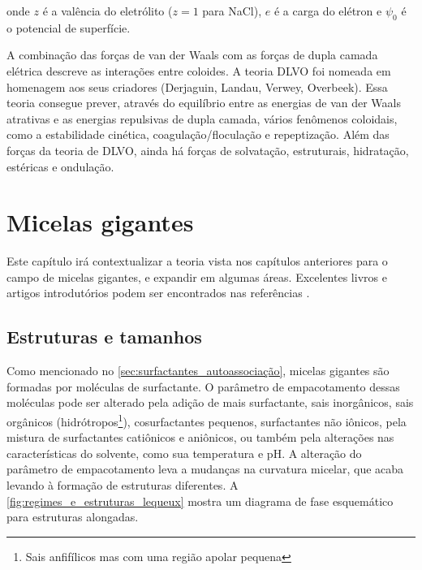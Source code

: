 	\noindent onde \(z\) é a valência do eletrólito (\(z=1\) para NaCl), \(e\) é a carga do elétron e \(\psi_0\) é o potencial de superfície.
	
	A combinação das forças de van der Waals com as forças de dupla camada elétrica descreve as interações entre coloides. A teoria DLVO foi nomeada em homenagem aos seus criadores (Derjaguin, Landau, Verwey, Overbeek). Essa teoria consegue prever, através do equilíbrio entre as energias de van der Waals atrativas e as energias repulsivas de dupla camada, vários fenômenos coloidais, como a estabilidade cinética, coagulação/floculação e repeptização. Além das forças da teoria de DLVO, ainda há forças de solvatação, estruturais, hidratação, estéricas e ondulação. 
	

	\chapter{Micelas gigantes} 
	Este capítulo irá contextualizar a teoria vista nos capítulos anteriores para o campo de micelas gigantes, e expandir em algumas áreas. Excelentes livros e artigos introdutórios podem ser encontrados nas referências \cite{Dreiss2007, Giant_Micelles, WLM_Advances, Herb1994, Ezrahi2006}.

		\label{chap:micelas_gigantes}
		\section{Estruturas e tamanhos}  %
		Como mencionado no \autoref{sec:surfactantes_autoassociação}, micelas gigantes são formadas por moléculas de surfactante. O parâmetro de empacotamento dessas moléculas pode ser alterado pela adição de mais surfactante, sais inorgânicos, sais orgânicos (hidrótropos\footnote{Sais anfifílicos mas com uma região apolar pequena}), cosurfactantes pequenos, surfactantes não iônicos, pela mistura de surfactantes catiônicos e aniônicos, ou também pela alterações nas características do solvente, como sua temperatura e pH.\cite{Dreiss2007} A alteração do parâmetro de empacotamento leva a mudanças na curvatura micelar, que acaba levando à formação de estruturas diferentes. A \autoref{fig:regimes_e_estruturas_lequeux} mostra um diagrama de fase esquemático para estruturas alongadas.
		
